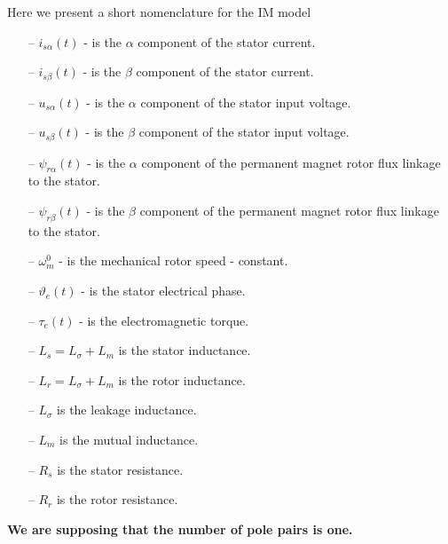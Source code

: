 \documentclass[11pt,a4paper,oneside]{book}
\numberwithin{equation}{section}
\theoremstyle{it}
\theoremstyle{definition}
\begin{document}
Here we present a short nomenclature for the IM model
\begin{itemize}
	\item[--] $i_{s\alpha}(t)$ - is the $\alpha$ component of the stator 
	current.
	\item[--] $i_{s\beta}(t)$ - is the $\beta$ component of the stator current.
	\item[--] $u_{s\alpha}(t)$ - is the $\alpha$ component of the stator input 
	voltage.
	\item[--] $u_{s\beta}(t)$ - is the $\beta$ component of the stator input 
	voltage.
	\item[--] $\psi_{r\alpha}(t)$ - is the $\alpha$ component of the permanent 
	magnet rotor flux linkage to the stator.
	\item[--] $\psi_{r\beta}(t)$ - is the $\beta$ component of the permanent 
	magnet rotor flux linkage to the stator.
	\item[--] $\omega_m^0$ - is the mechanical rotor speed - constant.
	\item[--] $\vartheta_e(t)$ - is the stator electrical phase.	
	\item[--] $\tau_e(t)$ - is the electromagnetic torque.
	\item[--] $L_s=L_\sigma+L_m$ is the stator inductance.
	\item[--] $L_r=L_\sigma+L_m$ is the rotor inductance.
	\item[--] $L_\sigma$ is the leakage inductance.
	\item[--] $L_m$ is the mutual inductance.
	\item[--] $R_s$ is the stator resistance.
	\item[--] $R_r$ is the rotor resistance.
\end{itemize}
\textbf{We are supposing that the number of pole pairs is one.}
\end{document}
